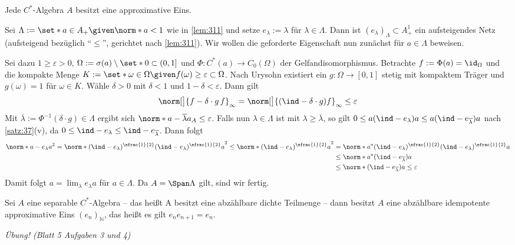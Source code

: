 \begin{satz}[{name=[Existenz von approximativen Einsen]},label=satz:313]
	Jede $C^*$-Algebra $A$ besitzt eine approximative Eins.
\end{satz}
\begin{beweis}
	Sei $\Lambda := \set*{a \in A_+ \given \norm*{a} < 1}$ wie in \autoref{lem:311} und setze $e_\lambda := \lambda$ für $\lambda \in \Lambda$. 
	Dann ist $(e_\lambda)_\Lambda \subset A_+^1$ ein aufsteigendes Netz (aufsteigend bezüglich \enquote{$\le$}, gerichtet nach \autoref{lem:311}). 
	Wir wollen die geforderte Eigenschaft nun zunächst für $a \in \Lambda$ beweisen.
	
	Sei dazu $1 \ge \varepsilon>0$, $\Omega := \sigma(a) \setminus \set*{0} \subset (0,1]$ und $\Phi \colon C^*(a) \to C_0(\Omega)$ der Gelfandisomorphismus. 
	Betrachte $f := \Phi(a) = \id_\Omega$ und die kompakte Menge $K:= \set*{\omega \in \Omega \given f(\omega)\ge \varepsilon} \subset \Omega$. 
	Nach Urysohn existiert ein $g \colon \Omega \to [0,1]$ stetig mit kompaktem Träger und $g(\omega)=1$ für $\omega \in K$. 
	Wähle $\delta>0$ mit $\delta<1$ und $1-\delta< \varepsilon$. Dann gilt 
	\[
		\norm[\big]{f- \delta \cdot g \,f}_\infty = \norm[\big]{(\ind-\delta \cdot g) f}_\infty \le \varepsilon
	\]
	Mit $\overline{\lambda} := \Phi^{-1}(\delta \cdot g) \in \Lambda$ ergibt sich $\norm*{a- \overline{\lambda} a}_A \le \varepsilon$. 
	Falls nun $\lambda \in \Lambda$ ist mit $\lambda \ge \overline{\lambda}$, so gilt $0 \le a(\ind-e_\lambda)a \le a(\ind- e_{\overline{\lambda}})a$ nach \autoref{satz:37}(v), da $0 \le \ind - e_\lambda \le \ind -e_{\overline{\lambda}}$.
	Dann folgt 
	\begin{align}
		\norm*{a- e_\lambda a}^2 = \norm*{(\ind-e_\lambda)^{\sfrac{1}{2}} (\ind - e_\lambda)^{\sfrac{1}{2}} a}^2 \le \norm*{(\ind- e_\lambda)^{\sfrac{1}{2}}a}^2
		 &= \norm*{a^* (\ind -e_\lambda)^{\sfrac{1}{2}}(\ind-e_\lambda)^{\sfrac{1}{2}}a} \\
		 &\le \norm*{a^* (\ind-e_{\overline{\lambda}})a} \\
		 &\le \norm*{(\ind-e_{\overline{\lambda}})a} \le \varepsilon
	\end{align}
	Damit folgt $a = \lim_\lambda e_\lambda a$ für $a \in \Lambda$. Da $A= \Span \Lambda$ gilt, sind wir fertig.
\end{beweis}

\begin{proposition}[{name=[approximative Einsen in separablen C*-Algbren]}]
	Sei $A$ eine separable $C^*$-Algebra -- das heißt A besitzt eine abzählbare dichte Teilmenge -- dann besitzt $A$ eine abzählbare idempotente approximative Eins $(e_n)_\mathbb{N}$, das heißt es gilt $e_n e_{n+1}=e_n$.
\end{proposition}
\begin{beweis}
	\emph{Übung! (Blatt 5 Aufgaben 3 und 4)}
\end{beweis}
\newpage

